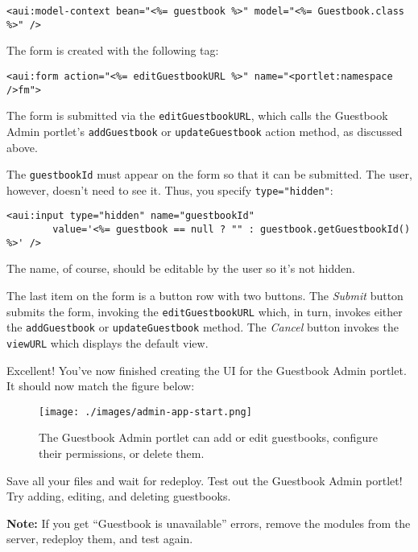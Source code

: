 \begin{verbatim}
<aui:model-context bean="<%= guestbook %>" model="<%= Guestbook.class %>" />
\end{verbatim}

The form is created with the following tag:

\begin{verbatim}
<aui:form action="<%= editGuestbookURL %>" name="<portlet:namespace />fm">
\end{verbatim}

The form is submitted via the \texttt{editGuestbookURL}, which calls the
Guestbook Admin portlet's \texttt{addGuestbook} or
\texttt{updateGuestbook} action method, as discussed above.

The \texttt{guestbookId} must appear on the form so that it can be
submitted. The user, however, doesn't need to see it. Thus, you specify
\texttt{type="hidden"}:

\begin{verbatim}
<aui:input type="hidden" name="guestbookId"
        value='<%= guestbook == null ? "" : guestbook.getGuestbookId() %>' />
\end{verbatim}

The name, of course, should be editable by the user so it's not hidden.

The last item on the form is a button row with two buttons. The
\emph{Submit} button submits the form, invoking the
\texttt{editGuestbookURL} which, in turn, invokes either the
\texttt{addGuestbook} or \texttt{updateGuestbook} method. The
\emph{Cancel} button invokes the \texttt{viewURL} which displays the
default view.

Excellent! You've now finished creating the UI for the Guestbook Admin
portlet. It should now match the figure below:

\begin{figure}
\centering
\texttt{[image: ./images/admin-app-start.png]}
\caption{The Guestbook Admin portlet can add or edit guestbooks,
configure their permissions, or delete them.}
\end{figure}

Save all your files and wait for redeploy. Test out the Guestbook Admin
portlet! Try adding, editing, and deleting guestbooks.

\noindent\hrulefill

\textbf{Note:} If you get ``Guestbook is unavailable'' errors, remove
the modules from the server, redeploy them, and test again.

